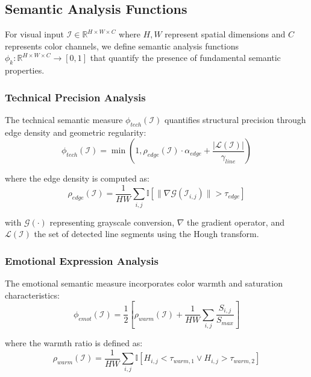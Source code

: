 \documentclass[11pt,a4paper]{article}
\begin{document}
\subsection{Semantic Analysis Functions}

For visual input $\mathcal{I} \in \mathbb{R}^{H \times W \times C}$ where $H, W$ represent spatial dimensions and $C$ represents color channels, we define semantic analysis functions $\phi_k: \mathbb{R}^{H \times W \times C} \to [0,1]$ that quantify the presence of fundamental semantic properties.

\subsubsection{Technical Precision Analysis}

The technical semantic measure $\phi_{tech}(\mathcal{I})$ quantifies structural precision through edge density and geometric regularity:
\begin{equation}
\phi_{tech}(\mathcal{I}) = \min\left(1, \rho_{edge}(\mathcal{I}) \cdot \alpha_{edge} + \frac{|\mathcal{L}(\mathcal{I})|}{\gamma_{line}}\right)
\label{eq:technical-measure}
\end{equation}

where the edge density is computed as:
\begin{equation}
\rho_{edge}(\mathcal{I}) = \frac{1}{HW} \sum_{i,j} \mathbb{I}[\|\nabla \mathcal{G}(\mathcal{I}_{i,j})\| > \tau_{edge}]
\label{eq:edge-density}
\end{equation}

with $\mathcal{G}(\cdot)$ representing grayscale conversion, $\nabla$ the gradient operator, and $\mathcal{L}(\mathcal{I})$ the set of detected line segments using the Hough transform.

\subsubsection{Emotional Expression Analysis}

The emotional semantic measure incorporates color warmth and saturation characteristics:
\begin{equation}
\phi_{emot}(\mathcal{I}) = \frac{1}{2}\left[\rho_{warm}(\mathcal{I}) + \frac{1}{HW} \sum_{i,j} \frac{S_{i,j}}{S_{max}}\right]
\label{eq:emotional-measure}
\end{equation}

where the warmth ratio is defined as:
\begin{equation}
\rho_{warm}(\mathcal{I}) = \frac{1}{HW} \sum_{i,j} \mathbb{I}[H_{i,j} < \tau_{warm,1} \vee H_{i,j} > \tau_{warm,2}]
\label{eq:warmth-ratio}
\end{equation}
\end{document}
